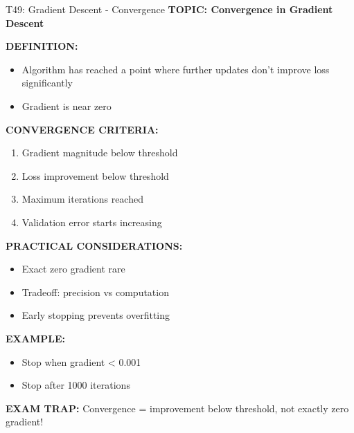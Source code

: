 \documentclass[8pt]{beamer}
\begin{document}
	\begin{frame}{T49: Gradient Descent - Convergence}
		\fontsize{6.5}{7.5}\selectfont
		\textbf{TOPIC: Convergence in Gradient Descent}
		
		\vspace{0.1cm}
		\textbf{DEFINITION:}
		\begin{itemize}
			\item Algorithm has reached a point where further updates don't improve loss significantly
			\item Gradient is near zero
		\end{itemize}
		
		\vspace{0.1cm}
		\textbf{CONVERGENCE CRITERIA:}
		\begin{enumerate}
			\item Gradient magnitude below threshold
			\item Loss improvement below threshold
			\item Maximum iterations reached
			\item Validation error starts increasing
		\end{enumerate}
		
		\vspace{0.1cm}
		\textbf{PRACTICAL CONSIDERATIONS:}
		\begin{itemize}
			\item Exact zero gradient rare
			\item Tradeoff: precision vs computation
			\item Early stopping prevents overfitting
		\end{itemize}
		
		\vspace{0.1cm}
		\textbf{EXAMPLE:}
		\begin{itemize}
			\item Stop when gradient < 0.001
			\item Stop after 1000 iterations
		\end{itemize}
		
		\textcolor{myred}{\textbf{EXAM TRAP:}} Convergence = \textcolor{myblue}{improvement below threshold}, not exactly zero gradient!
	\end{frame}
	
\end{document}
